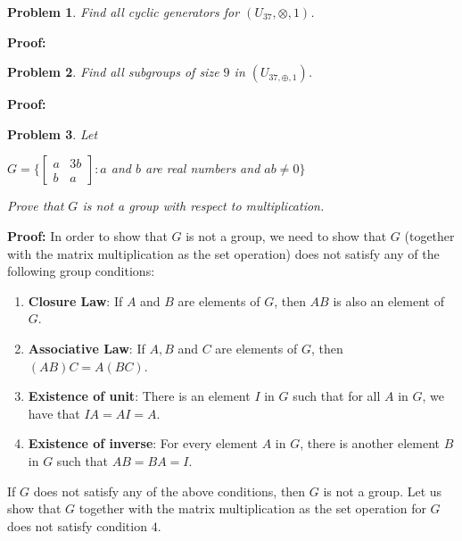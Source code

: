 \documentclass[a4paper,openany,11pt]{book}
\newtheorem{Prob}{Problem}
\begin{document}
	
	\begin{center}
	\end{center}

\begin{Prob}
	Find all cyclic generators for $(U_{37}, \otimes, 1)$.
\end{Prob}

\textbf{Proof:} 

\begin{Prob}
	Find all subgroups of size $9$ in $(U_{37,\oplus,1})$.
\end{Prob}

\textbf{Proof:} 

\begin{Prob}
	Let
	
	\begin{center}
		$G = \biggl\{\left[\begin{array}{cc}
		a & 3b\\
		b & a
		\end{array}\right] : a$ and $b$ are real numbers and $ab \neq 0\biggr\} $
	\end{center}

	Prove that $G$ is not a group with respect to multiplication.

\end{Prob}

\textbf{Proof:} In order to show that $G$ is not a group, we need to show that $G$ (together with the matrix multiplication as the set operation) does not satisfy any of the following group conditions:

\begin{enumerate}
	\item \textbf{Closure Law}: If $A$ and $B$ are elements of $G$, then $AB$ is also an element of $G$. 
	
	\item \textbf{Associative Law}: If $A, B$ and $C$ are elements of $G$, then $(AB)C = A(BC)$.
	
	\item \textbf{Existence of unit}: There is an element $I$ in $G$ such that for all $A$ in $G$, we have that $IA = AI = A$.
	
	\item \textbf{Existence of inverse}: For every element $A$ in $G$, there is another element $B$ in $G$ such that $AB = BA = I$.
\end{enumerate} 

If $G$ does not satisfy any of the above conditions, then $G$ is not a group. Let us show that $G$ together with the matrix multiplication as the set operation for $G$ does not satisfy condition $4$.\\
\end{document}
